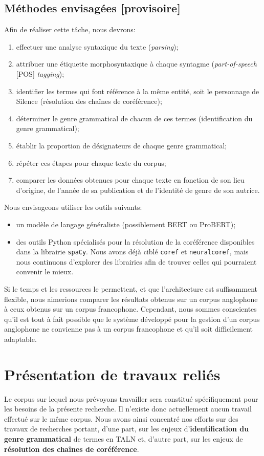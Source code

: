 \documentclass[hidelinks, 11pt, letterpaper]{article}
\begin{document}
\subsection*{Méthodes envisagées [provisoire]}
Afin de réaliser cette tâche, nous devrons:
\begin{enumerate}
    \item effectuer une analyse syntaxique du texte (\emph{parsing});
    \item attribuer une étiquette morphosyntaxique à chaque syntagme (\emph{part-of-speech} [POS] \emph{tagging});
    \item identifier les termes qui font référence à la même entité, soit le personnage de Silence (résolution des chaînes de coréférence);
    \item déterminer le genre grammatical de chacun de ces termes (identification du genre grammatical);
    \item établir la proportion de désignateurs de chaque genre grammatical;
    \item répéter ces étapes pour chaque texte du corpus;
    \item comparer les données obtenues pour chaque texte en fonction de son lieu d'origine, de l'année de sa publication et de l'identité de genre de son autrice.
\end{enumerate}

Nous envisageons utiliser les outils suivants:
\begin{itemize}
    \item un modèle de langage généraliste (possiblement BERT ou ProBERT);
    \item des outils Python spécialisés pour la résolution de la coréférence disponibles dans la librairie \texttt{spaCy}. Nous avons déjà ciblé \texttt{coref} et \texttt{neuralcoref}, mais nous continuons d'explorer des librairies afin de trouver celles qui pourraient convenir le mieux.
\end{itemize}

Si le temps et les ressources le permettent, et que l'architecture est suffisamment flexible, nous aimerions comparer les résultats obtenus sur un corpus anglophone à ceux obtenus sur un corpus francophone.
Cependant, nous sommes conscientes qu'il est tout à fait possible que le système développé pour la gestion d'un corpus anglophone ne convienne pas à un corpus francophone et qu'il soit difficilement adaptable.

\newpage

\section*{Présentation de travaux reliés}
Le corpus sur lequel nous prévoyons travailler sera constitué spécifiquement pour les besoins de la présente recherche.
Il n'existe donc actuellement aucun travail effectué sur le même corpus.
Nous avons ainsi concentré nos efforts sur des travaux de recherches portant, d'une part, sur les enjeux d'\textbf{identification du genre grammatical} de termes en TALN et, d'autre part, sur les enjeux de \textbf{résolution des chaînes de coréférence}.
\end{document}
